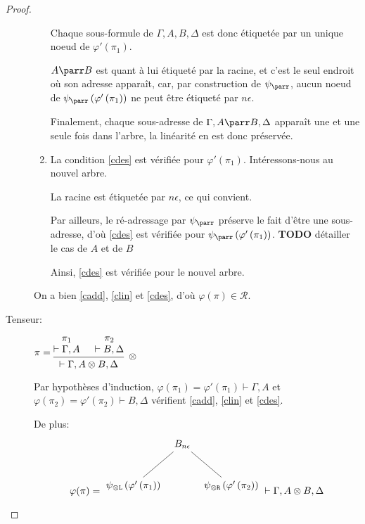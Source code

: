 \documentclass[11pt,a4paper]{article}
\theoremstyle{plain}
\theoremstyle{definition}
\theoremstyle{remark}
\newcommand*{\tensor}{\otimes}
\newcommand*{\namedproofv}[2]{\hypo{#1}\infer[no rule]{1}{\vdash #2}}
\newcommand*{\tensorv}[1]{\infer{2}[\ensuremath{\tensor}]{\vdash #1}}
\newcommand*{\someproof}{\pi}
\newcommand*{\sequent}{\Gamma}
\newcommand*{\Left}{\textnormal{\texttt{L}}}
\newcommand*{\Right}{\textnormal{\texttt{R}}}
\newcommand*{\representations}{\ensuremath{\mathcal{R}}}
\newcommand*{\encode}{\ensuremath{\varphi}}
\newcommand*{\todo}{{\normalfont \textbf{TODO}} }
\begin{document}
\begin{proof}
\begin{description}
\begin{enumerate}
        Chaque sous-formule de $\sequent, A, B, \Delta$ est donc étiquetée par un unique noeud de $\encode ' \left( \pi_1 \right)$.
        
        $A \parr B$ est quant à lui étiqueté par la racine, et c'est le seul endroit où son adresse apparaît, car, par construction de $\psi_\parr$, aucun noeud de $\psi_\parr \left( \encode' \left( \pi_1 \right) \right)$ ne peut être étiqueté par $n \epsilon$.

        Finalement, chaque sous-adresse de $\sequent, A \parr B, \Delta$ apparaît une et une seule fois dans l'arbre, la linéarité en est donc préservée.
        
        \item La condition \ref{cdes} est vérifiée pour $\encode ' \left( \pi_1 \right)$. Intéressons-nous au nouvel arbre.
        
        La racine est étiquetée par $n \epsilon$, ce qui convient.

        Par ailleurs, le ré-adressage par $\psi_\parr$ préserve le fait d'être une sous-adresse, d'où \ref{cdes} est vérifiée pour $\psi_\parr \left( \encode' \left( \pi_1 \right) \right)$.
\todo{détailler le cas de $A$ et de $B$}

        Ainsi, \ref{cdes} est vérifiée pour le nouvel arbre.
    \end{enumerate} 

    On a bien \ref{cadd}, \ref{clin} et \ref{cdes}, d'où $\encode \left( \someproof \right) \in \representations$.

     \item[Tenseur:] $\someproof =
    \begin{prooftree}
      \namedproofv{\pi_1}{\sequent, A}
      \namedproofv{\pi_2}{B, \Delta}
      \tensorv{\sequent, A \tensor B, \Delta}
    \end{prooftree}$

    Par hypothèses d'induction, $\encode \left( \pi_1 \right) = \encode ' \left( \pi_1 \right) \vdash \sequent, A$ et $\encode \left( \pi_2 \right) = \encode ' \left( \pi_2 \right) \vdash B, \Delta$ vérifient \ref{cadd}, \ref{clin} et \ref{cdes}.
    
    De plus:
    \begin{equation*}
    \encode ( \someproof ) = \begin{tikzpicture}%
    [level distance=1.5cm,
    level 1/.style={sibling distance=3.5cm}]
    \node {$B_{n \epsilon}$}
        child {node {$\psi_{\tensor\Left} \left( \encode' \left( \pi_1 \right) \right)$}}
        child {node {$\psi_{\tensor\Right} \left( \encode' \left( \pi_2 \right) \right)$}
    };
    \end{tikzpicture} \vdash \sequent, A \tensor B, \Delta
    \end{equation*}


\end{description}
\end{proof}
\end{document}

